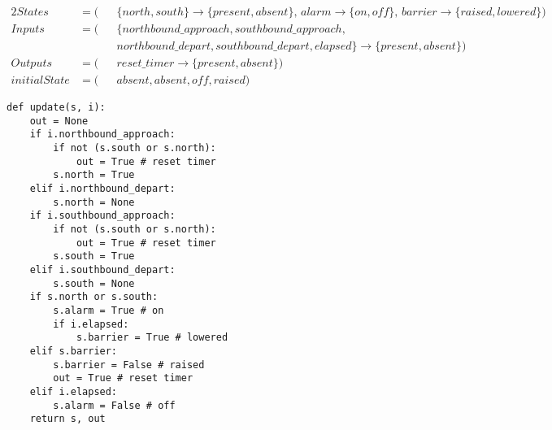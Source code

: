 \documentclass{minimal}
\begin{document}
\begin{alignat*}{2}
	States &= (&&\{north, south\}\rightarrow\{present, absent\},\,alarm\rightarrow\{on, off\},\,barrier\rightarrow\{raised, lowered\}) \\
	Inputs &= (&&\{northbound\_approach, southbound\_approach, \\
	&&&northbound\_depart, southbound\_depart, elapsed\}\rightarrow\{present, absent\}) \\
	Outputs &= (&&reset\_timer\rightarrow\{present, absent\}) \\
	initialState &= (&&absent, absent, off, raised)
\end{alignat*}

\begin{verbatim}
def update(s, i):
    out = None
    if i.northbound_approach:
        if not (s.south or s.north):
            out = True # reset timer
        s.north = True
    elif i.northbound_depart:
        s.north = None
    if i.southbound_approach:
        if not (s.south or s.north):
            out = True # reset timer
        s.south = True
    elif i.southbound_depart:
        s.south = None
    if s.north or s.south:
        s.alarm = True # on
        if i.elapsed:
            s.barrier = True # lowered
    elif s.barrier:
        s.barrier = False # raised
        out = True # reset timer
    elif i.elapsed:
        s.alarm = False # off
    return s, out
\end{verbatim}
\end{document}
